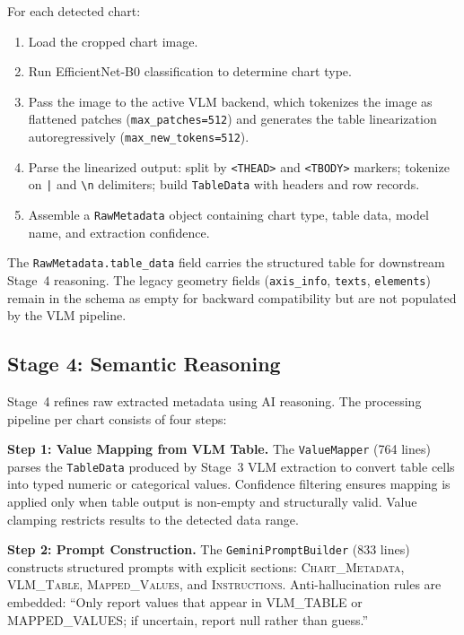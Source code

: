 For each detected chart:

\begin{enumerate}
    \item Load the cropped chart image.
    \item Run EfficientNet-B0 classification to determine chart type.
    \item Pass the image to the active VLM backend, which tokenizes the image as
          flattened patches (\texttt{max\_patches=512}) and generates the table
          linearization autoregressively (\texttt{max\_new\_tokens=512}).
    \item Parse the linearized output: split by \texttt{<THEAD>} and \texttt{<TBODY>}
          markers; tokenize on \texttt{|} and \texttt{\textbackslash n} delimiters;
          build \texttt{TableData} with headers and row records.
    \item Assemble a \texttt{RawMetadata} object containing chart type, table data,
          model name, and extraction confidence.
\end{enumerate}

The \texttt{RawMetadata.table\_data} field carries the structured table for downstream
Stage~4 reasoning. The legacy geometry fields (\texttt{axis\_info}, \texttt{texts},
\texttt{elements}) remain in the schema as empty for backward compatibility but are
not populated by the VLM pipeline.

\subsection{Stage 4: Semantic Reasoning}

Stage~4 refines raw extracted metadata using AI reasoning. The processing pipeline
per chart consists of four steps:

\textbf{Step 1: Value Mapping from VLM Table.}
The \texttt{ValueMapper} (764 lines) parses the \texttt{TableData} produced by
Stage~3 VLM extraction to convert table cells into typed numeric or categorical values.
Confidence filtering ensures mapping is applied only when table output is non-empty and
structurally valid. Value clamping restricts results to the detected data range.

\textbf{Step 2: Prompt Construction.}
The \texttt{GeminiPromptBuilder} (833 lines) constructs structured prompts with explicit
sections: \textsc{Chart\_Metadata}, \textsc{VLM\_Table}, \textsc{Mapped\_Values}, and
\textsc{Instructions}. Anti-hallucination rules are embedded: ``Only report values that
appear in VLM\_TABLE or MAPPED\_VALUES; if uncertain, report null rather than guess.''

